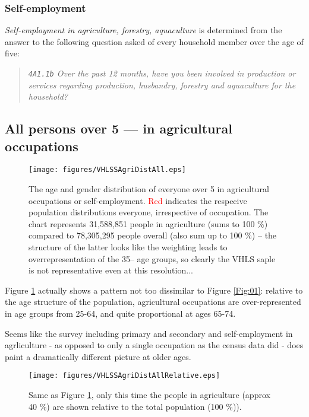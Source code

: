 \documentclass{article}
\begin{document}
\subsubsection{Self-employment}

\emph{\emph{Self-employment} in agriculture, forestry, aquaculture }is determined from the answer to the following question asked of every household member over the age of five:

\begin{quote}
\emph{\texttt{4A1.1b} Over the past 12 months, have you been involved in production or services regarding production, husbandry, forestry and aquaculture for the household?}
\end{quote}

\subsection{All persons over 5 --- in agricultural occupations}\label{Sec:VAll}


\begin{figure}[htbp!]

\texttt{[image: figures/VHLSSAgriDistAll.eps]}
\caption{The age and gender distribution of everyone over 5 in agricultural occupations or self-employment. \textcolor{red}{Red} indicates the respecive population distributions everyone, irrespective of occupation. The chart represents 31,588,851 people in agriculture (sums to 100 \%) compared to 78,305,295 people overall (also sum up to 100 \%) -- the structure of the latter looks like the weighting leads to overrepresentation of the 35-- age groups, so clearly the VHLS saple is not representative even at this resolution...}\label{Fig:03}
\end{figure}

Figure \ref{Fig:03} actually shows a pattern not too dissimilar to Figure \ref{Fig:01}: relative to the age structure of the population, agricultural occupations are over-represented in age groups from 25-64, and quite proportional at ages 65-74. 

Seems like the survey including primary and secondary and self-employment in agrliculture - as opposed to only a single occupation as the census data did - does paint a dramatically different picture at older ages. 
 
\begin{figure}[htbp!]

\texttt{[image: figures/VHLSSAgriDistAllRelative.eps]}
\caption{Same as Figure \ref{Fig:03}, only this time the people in agriculture (approx 40 \%) are shown  relative to the total population (100 \%)).}\label{Fig:04}
\end{figure}
\end{document}
